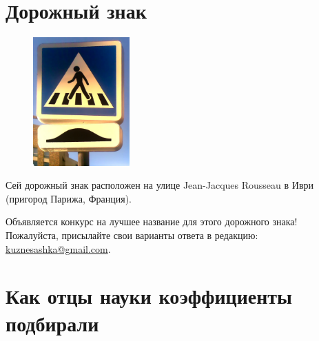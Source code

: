 \documentclass[11pt]{article}
\date{\vspace{-5.5ex}}
\begin{document}
	
	
	\AUTHOR{}{}
	\SHORTAUTHOR{}
	
\DoFirstPageTechnicalStuff
\vspace{-10ex}

\section{Дорожный знак}

\begin{figure}\centering\vspace{-2.2ex}
	\includegraphics[width=3.7cm]{Normal-warning2.jpg}\vspace{-5ex}
\end{figure}
Сей дорожный знак расположен на улице Jean-Jacques Rousseau в Иври (пригород Парижа, Франция).

Объявляется конкурс на лучшее название для этого дорожного знака! Пожалуйста, присылайте свои варианты ответа в редакцию: \href{mailto:kuznesashka@gmail.com}{kuznesashka@gmail.com}. 

\section{Как отцы науки коэффициенты подбирали}

\end{document}
